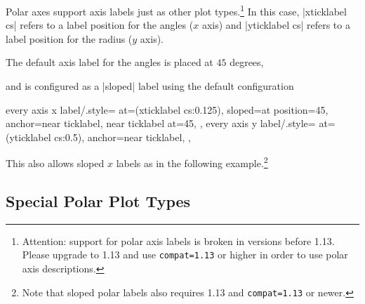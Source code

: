 {Polar axes support axis labels just as other plot types.\footnote{Attention:
support for polar axis labels is broken in versions before 1.13. Please upgrade
to \PGFPlots{} 1.13 and use \texttt{compat=1.13} or higher in order to use
polar axis descriptions.} In this case, |xticklabel cs| refers to a label
position for the angles ($x$ axis) and |yticklabel cs| refers to a label
position for the radius ($y$ axis).

The default axis label for the angles is placed at $45$ degrees,
%
\begin{codeexample}[]
\end{codeexample}
%
and is configured as a |sloped| label using the
default configuration
%
\begin{codeexample}
    every axis x label/.style={
        at={(xticklabel cs:0.125)},
        sloped={at position=45},
        anchor=near ticklabel,
        near ticklabel at=45,
    },
    every axis y label/.style={
        at={(yticklabel cs:0.5)},
        anchor=near ticklabel,
    },
\end{codeexample}

This also allows sloped $x$ labels as in the following example.\footnote{Note
that sloped polar labels also requires \PGFPlots{} 1.13 and
\texttt{compat=1.13} or newer.}
%
\begin{codeexample}[]
\end{codeexample}


\subsection{Special Polar Plot Types}

}
